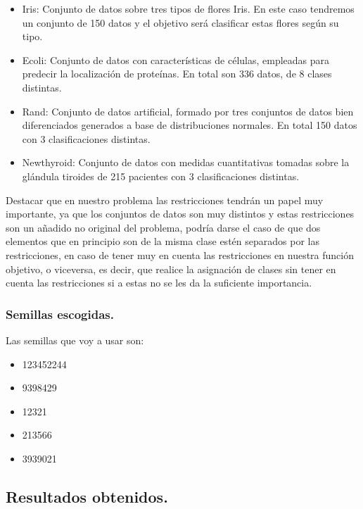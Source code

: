 \documentclass[12pt, spanish]{article}
\begin{document}
\begin{itemize}
	\item{Iris: Conjunto de datos sobre tres tipos de flores Iris. En este caso tendremos un conjunto de 150 datos y el objetivo será clasificar estas flores según su tipo.}
	\item{Ecoli: Conjunto de datos con características de células, empleadas para predecir la localización de proteínas. En total son 336 datos, de 8 clases distintas.}
	\item{Rand: Conjunto de datos artificial, formado por tres conjuntos de datos bien diferenciados generados a base de distribuciones normales. En total 150 datos con 3 clasificaciones distintas.}
	\item{Newthyroid: Conjunto de datos con medidas cuantitativas tomadas sobre la glándula tiroides de 215 pacientes con 3 clasificaciones distintas.} 
\end{itemize}

Destacar que en nuestro problema las restricciones tendrán un papel muy importante, ya que los conjuntos de datos son muy distintos y estas restricciones son un añadido no original del problema, podría darse el caso de que dos elementos que en principio son de la misma clase estén separados por las restricciones, en caso de tener muy en cuenta las restricciones en nuestra función objetivo, o viceversa, es decir, que realice la asignación de clases sin tener en cuenta las restricciones si a estas no se les da la suficiente importancia.



\subsubsection{Semillas escogidas.}

Las semillas que voy a usar son:

\begin{itemize}
	\item {123452244}
	\item {9398429}
	\item {12321}
	\item {213566}
	\item {3939021}
\end{itemize}

\newpage


\subsection{Resultados obtenidos.}
\end{document}

